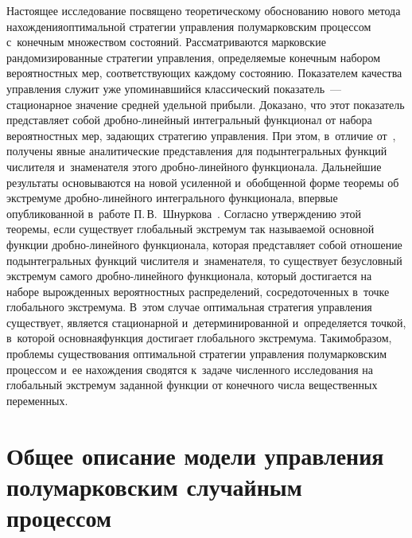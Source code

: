 \begin{multicols}{2}
Настоящее исследование посвящено теоретическому обоснованию нового метода 
нахождения\linebreak оптимальной стратегии управления полумарковским процессом с~конечным 
множеством со\-сто\-яний. Рассматриваются марковские рандомизи\-рованные стратегии 
управления, определяемые конеч\-ным набором вероятностных мер, соответствующих 
каждому состоянию. Показателем качества управления служит уже упоминавшийся 
классический  показатель~--- стационарное значение средней удельной прибыли. 
Доказано, что этот показатель представляет собой дроб\-но-ли\-ней\-ный интегральный 
функционал от набора вероятностных мер, задающих стратегию управления. При этом, 
в~отличие от~\cite{12}, получены явные аналитические представления для подынтегральных 
функций числителя и~знаменателя этого дроб\-но-ли\-ней\-но\-го\linebreak
 функционала. Дальнейшие 
результаты основываются на новой усиленной и~обобщенной форме\linebreak
 теоремы об экстремуме 
дроб\-но-ли\-ней\-но\-го интегрального функционала, впервые опубликованной 
в~работе П.\,В.~Шнуркова~\cite{14}. Согласно\linebreak
 утверж\-де\-нию этой теоремы, если 
существует глобальный экстремум так называемой основной функции дроб\-но-ли\-ней\-но\-го 
функционала, которая пред\-став\-ля\-ет собой отношение подынтегральных функций чис\-ли\-те\-ля 
и~знаменателя, то существует безусловный экстремум самого дроб\-но-ли\-ней\-но\-го 
функционала, который достигается на наборе вырожденных вероятностных распределений, 
сосредоточенных в~точке глобального экстремума. В~этом случае оптимальная стратегия 
управ\-ле\-ния существует, является стационарной и~детерминированной и~определяется точкой, 
в~которой основная\linebreak функция достигает глобального экстремума. Таким\linebreak образом, проблемы 
существования оптимальной стратегии управ\-ле\-ния полумарковским процессом и~ее 
нахождения сводятся к~задаче чис\-лен\-но\-го исследования на глобальный экстремум 
заданной функции от конечного чис\-ла вещественных переменных.

\section{Общее описание модели управления полумарковским случайным процессом}


\end{multicols}

